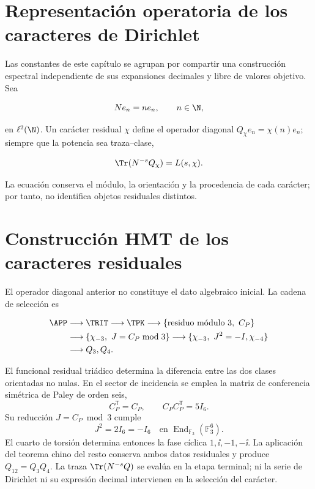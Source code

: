 \label{ch:spectral}

\section{Representaci\'on operatoria de los caracteres de Dirichlet}

Las constantes de este cap\'itulo se agrupan por compartir una construcci\'on
espectral independiente de sus expansiones decimales y libre de valores
objetivo. Sea

\[
Ne_n=ne_n,\qquad n\in\N,
\]

en \(\ell^2(\N)\). Un car\'acter residual \(\chi\) define el operador diagonal \(Q_\chi e_n=\chi(n)e_n\); siempre que la potencia sea traza--clase,

\begin{equation}
\Tr(N^{-s}Q_\chi)=L(s,\chi).
\label{eq:L-trace}
\end{equation}

La ecuaci\'on conserva el m\'odulo, la orientaci\'on y la procedencia de cada
car\'acter; por tanto, no identifica objetos residuales distintos.

\section{Construcci\'on HMT de los caracteres residuales}

El operador diagonal anterior no constituye el dato algebraico inicial. La
cadena de selecci\'on es

\[
\begin{aligned}
\APP&\longrightarrow\TRIT\longrightarrow\TPK
\longrightarrow\{\text{residuo m\'odulo }3,\ C_P\}\\
&\longrightarrow\{\chi_{-3},\ J=C_P\bmod3\}
\longrightarrow\{\chi_{-3},\ J^2=-I,\chi_{-4}\}\\
&\longrightarrow Q_3,Q_4.
\end{aligned}
\]

El funcional residual tri\'adico determina la diferencia entre las dos clases
orientadas no nulas. En el sector de incidencia se emplea la matriz de conferencia
sim\'etrica de Paley de orden seis,
\[
C_P^{\mathsf T}=C_P,\qquad C_PC_P^{\mathsf T}=5I_6.
\]
Su reducci\'on \(J=C_P\bmod3\) cumple
\[
J^2=2I_6=-I_6
\quad\text{en }\operatorname{End}_{\mathbb F_3}(\mathbb F_3^6).
\]
El cuarto de torsi\'on determina entonces la fase c\'iclica
\(1,\ii,-1,-\ii\). La aplicaci\'on del teorema chino del resto conserva
ambos datos residuales y produce \(Q_{12}=Q_3Q_4\). La traza
\(\Tr(N^{-s}Q)\) se eval\'ua en la etapa terminal; ni la serie de Dirichlet
ni su expresi\'on decimal intervienen en la selecci\'on del car\'acter.

